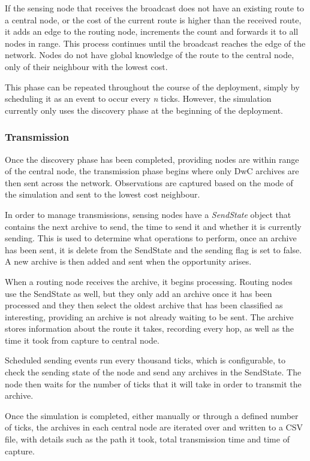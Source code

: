 	If the sensing node that receives the broadcast does not have an existing route to a central node, or the cost of the current route is higher than the received route, it adds an edge to the routing node, increments the count and forwards it to all nodes in range. This process continues until the broadcast reaches the edge of the network. Nodes do not have global knowledge of the route to the central node, only of their neighbour with the lowest cost.
	
	This phase can be repeated throughout the course of the deployment, simply by scheduling it as an event to occur every \textit{n} ticks. However, the simulation currently only uses the discovery phase at the beginning of the deployment.
	
\subsubsection{Transmission}
	Once the discovery phase has been completed, providing nodes are within range of the central node, the transmission phase begins where only DwC archives are then sent across the network. Observations are captured based on the mode of the simulation and sent to the lowest cost neighbour.
	
	In order to manage transmissions, sensing nodes have a \textit{SendState} object that contains the next archive to send, the time to send it and whether it is currently sending. This is used to determine what operations to perform, once an archive has been sent, it is delete from the SendState and the sending flag is set to false. A new archive is then added and sent when the opportunity arises.
	
	When a routing node receives the archive, it begins processing. Routing nodes use the SendState as well, but they only add an archive once it has been processed and they then select the oldest archive that has been classified as interesting, providing an archive is not already waiting to be sent. The archive stores information about the route it takes, recording every hop, as well as the time it took from capture to central node.
	
	Scheduled sending events run every thousand ticks, which is configurable, to check the sending state of the node and send any archives in the SendState. The node then waits for the number of ticks that it will take in order to transmit the archive.
	
	Once the simulation is completed, either manually or through a defined number of ticks, the archives in each central node are iterated over and written to a CSV file, with details such as the path it took, total transmission time and time of capture.
	
